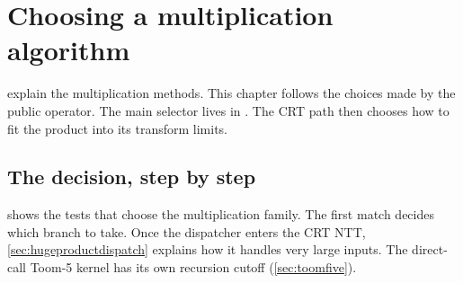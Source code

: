 \chapter{Choosing a multiplication algorithm}
\label{ch:muldispatch}

 explain the multiplication methods. This
chapter follows the choices made by the public operator. The main selector
lives in . The CRT path then chooses
how to fit the product into its transform limits.

\section{The decision, step by step}

 shows the tests that choose the multiplication family.
The first match decides which branch to take. Once the dispatcher enters the
CRT NTT, \cref{sec:hugeproductdispatch} explains how it handles very large inputs.
The direct-call Toom-5 kernel has its own recursion cutoff
(\cref{sec:toomfive}).

